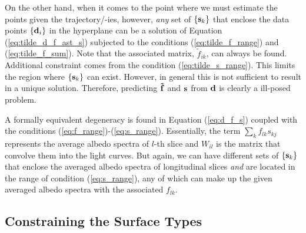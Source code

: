 \documentclass[iop,numberedappendix,apj,]{emulateapj}
\def\fast{\tilde f}
\begin{document}
On the other hand, when it comes to the point where we must estimate the points given the trajectory/-ies, however, {\it any} set of $\{ {\bf s}_k \}$ that enclose the data points $\{{\bf d}_i\}$ in the hyperplane can be a solution of Equation (\ref{eq:tilde_d_f_ast_s}) subjected to the conditions (\ref{eq:tilde_f_range}) and (\ref{eq:tilde_f_sum}). 
Note that the associated matrix, $\fast _{ik}$, can always be found. 
Additional constraint comes from the condition (\ref{eq:tilde_s_range}). This limits the region where $\{ {\bf s}_k \}$ can exist. 
However, in general this is not sufficient to result in a unique solution. 
Therefore, predicting ${\bf \fast }$ and ${\bf s}$ from ${\bf d}$ is clearly a ill-posed problem. 

A formally equivalent degeneracy is found in Equation (\ref{eq:d_f_s}) coupled with the conditions (\ref{eq:f_range})-(\ref{eq:s_range}). 
Essentially, the term $\sum _k f_{lk} s_{kj}$ represents the average albedo spectra of $l$-th slice and $W_{il}$ is the matrix that convolve them into the light curves. 
But again, we can have different sets of $\{ {\bf s}_k \}$ that enclose the averaged albedo spectra of longitudinal slices {\it and} are located in the range of condition (\ref{eq:s_range}), any of which can make up the given averaged albedo spectra with the associated $f_{lk}$. 


\subsection{Constraining the Surface Types}
\label{ss:constraining}
\end{document}
